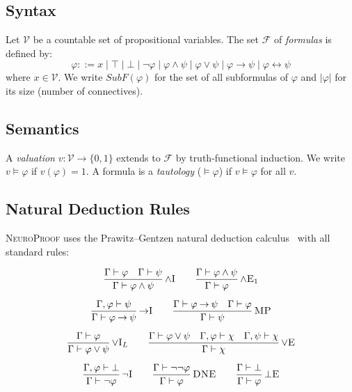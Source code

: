 \documentclass[conference]{IEEEtran}
\newcommand{\entails}{\vDash}
\newcommand{\proves}{\vdash}
\newcommand{\dland}{\mathbin{\wedge}}
\newcommand{\dlor}{\mathbin{\vee}}
\newcommand{\dlnot}{\neg}
\newcommand{\dlimp}{\mathbin{\to}}
\newcommand{\dliff}{\mathbin{\leftrightarrow}}
\newcommand{\dlbot}{\bot}
\newcommand{\dltop}{\top}
\newcommand{\Fml}{\mathcal{F}}
\newcommand{\NP}{\textsc{NeuroProof}}
\newcommand{\infrule}[3]{
  \dfrac{\displaystyle #2}{\displaystyle #3}\,\textsc{#1}
}
\begin{document}
\subsection{Syntax}

Let $\mathcal{V}$ be a countable set of propositional variables.
The set $\Fml$ of \emph{formulas} is defined by:
\begin{equation}
  \varphi ::= x \mid \dltop \mid \dlbot \mid \dlnot\varphi
    \mid \varphi \dland \psi \mid \varphi \dlor \psi
    \mid \varphi \dlimp \psi \mid \varphi \dliff \psi
\end{equation}
where $x \in \mathcal{V}$.
We write $\mathit{SubF}(\varphi)$ for the set of all subformulas
of $\varphi$ and $|\varphi|$ for its size (number of connectives).

\subsection{Semantics}

A \emph{valuation} $v : \mathcal{V} \to \{0,1\}$ extends to $\Fml$
by truth-functional induction.  We write $v \entails \varphi$ if
$v(\varphi) = 1$.  A formula is a \emph{tautology} ($\entails \varphi$)
if $v \entails \varphi$ for all $v$.

\subsection{Natural Deduction Rules}

\NP{} uses the Prawitz--Gentzen natural deduction
calculus~\cite{Prawitz1965} with all standard rules:

\medskip
\begin{gather}
  \infrule{$\wedge$I}
    {\Gamma \proves \varphi \quad \Gamma \proves \psi}
    {\Gamma \proves \varphi \dland \psi}
  \qquad
  \infrule{$\wedge$E$_1$}
    {\Gamma \proves \varphi \dland \psi}
    {\Gamma \proves \varphi}
  \label{eq:and-rules}
  \\[6pt]
  \infrule{$\to$I}
    {\Gamma, \varphi \proves \psi}
    {\Gamma \proves \varphi \dlimp \psi}
  \qquad
  \infrule{MP}
    {\Gamma \proves \varphi \dlimp \psi \quad \Gamma \proves \varphi}
    {\Gamma \proves \psi}
  \label{eq:imp-rules}
  \\[6pt]
  \infrule{$\vee$I$_L$}
    {\Gamma \proves \varphi}
    {\Gamma \proves \varphi \dlor \psi}
  \qquad
  \infrule{$\vee$E}
    {\Gamma \proves \varphi \dlor \psi \quad
     \Gamma, \varphi \proves \chi \quad
     \Gamma, \psi \proves \chi}
    {\Gamma \proves \chi}
  \label{eq:or-rules}
  \\[6pt]
  \infrule{$\dlnot$I}
    {\Gamma, \varphi \proves \dlbot}
    {\Gamma \proves \dlnot\varphi}
  \qquad
  \infrule{DNE}
    {\Gamma \proves \dlnot\dlnot\varphi}
    {\Gamma \proves \varphi}
  \qquad
  \infrule{$\dlbot$E}
    {\Gamma \proves \dlbot}
    {\Gamma \proves \varphi}
  \label{eq:not-rules}
\end{gather}
\end{document}
